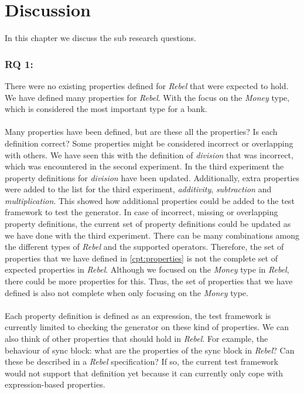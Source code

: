 \chapter{Discussion}
\label{cpt:discussion}
In this chapter we discuss the sub research questions.

\subsection*{RQ 1: \rqOne{}}
There were no existing properties defined for \textit{Rebel} that were expected
to hold. We have defined many properties for \textit{Rebel}. With the focus on
the \textit{Money} type, which is considered the most important type for a
bank.\\
\\
Many properties have been defined, but are these all the properties? Is each
definition correct? Some properties might be considered incorrect or overlapping
with others. We have seen this with the definition of \textit{division} that was
incorrect, which was encountered in the second experiment. In the
third experiment the property definitions for \textit{division} have been
updated. Additionally, extra properties were added to the list for the third
experiment, \textit{additivity}, \textit{subtraction} and
\textit{multiplication}. This showed how additional properties could be added to
the test framework to test the generator. In case of incorrect, missing or
overlapping property definitions, the current set of property definitions could
be updated as we have done with the third experiment. There can be many
combinations among the different types of \textit{Rebel} and the supported
operators. Therefore, the set of properties that we have defined in
\autoref{cpt:properties} is not the complete set of expected properties in
\textit{Rebel}. Although we focused on the \textit{Money} type in \textit{Rebel}, there could be more properties for this. Thus, the set of properties that we have defined is also not complete when only focusing on the \textit{Money} type.\\
\\
Each property definition is defined as an expression, the test framework is
currently limited to checking the generator on these kind of properties. We can also
think of other properties that should hold in \textit{Rebel}. For example, the
behaviour of sync block: what are the properties of the sync block in
\textit{Rebel}? Can these be described in a \textit{Rebel} specification? If so,
the current test framework would not support that definition yet because it can
currently only cope with expression-based properties.


